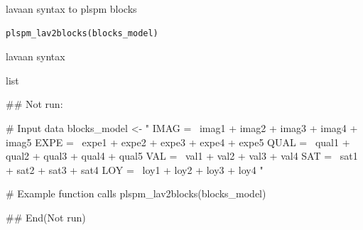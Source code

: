 \documentclass[a4paper]{book}
\begin{document}
%
\begin{Description}
lavaan syntax to plspm blocks
\end{Description}
%
\begin{Usage}
\begin{verbatim}
plspm_lav2blocks(blocks_model)
\end{verbatim}
\end{Usage}
%
\begin{Arguments}
\begin{ldescription}
\item[\code{blocks\_model}] lavaan syntax
\end{ldescription}
\end{Arguments}
%
\begin{Value}
list
\end{Value}
%
\begin{Examples}
\begin{ExampleCode}
\#\# Not run: 

# Input data
blocks_model <- "
IMAG =~ imag1 + imag2 + imag3 + imag4 + imag5
EXPE =~ expe1 + expe2 + expe3 + expe4 + expe5
QUAL =~ qual1 + qual2 + qual3 + qual4 + qual5
VAL =~ val1 + val2 + val3 + val4
SAT =~ sat1 + sat2 + sat3 + sat4
LOY =~ loy1 + loy2 + loy3 + loy4
"

# Example function calls
plspm_lav2blocks(blocks_model)


## End(Not run)
\end{ExampleCode}
\end{Examples}
\end{document}
